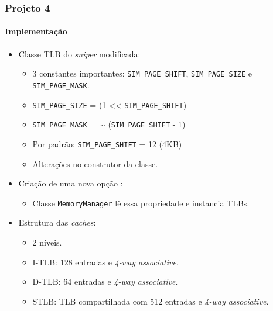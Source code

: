 \documentclass[10pt]{beamer}
\begin{document}
\begin{frame}
\frametitle{Projeto 4}
\framesubtitle{Implementação}

\begin{itemize}

\item Classe TLB do \textit{sniper} modificada:

\begin{itemize} 
	\item 3 constantes importantes: \texttt{SIM\_PAGE\_SHIFT},
	\texttt{SIM\_PAGE\_SIZE} e \texttt{SIM\_PAGE\_MASK}.
	\item \texttt{SIM\_PAGE\_SIZE} = (1 << \texttt{SIM\_PAGE\_SHIFT})
	\item \texttt{SIM\_PAGE\_MASK} = \(\sim\) (\texttt{SIM\_PAGE\_SHIFT} - 1)
	\item Por padrão: \texttt{SIM\_PAGE\_SHIFT} = 12 (4KB)
	\item Alterações no construtor da classe. 
		
\end{itemize} 

\item Criação de uma nova opção :
 
\begin{itemize} 
	\item Classe \texttt{MemoryManager} lê essa propriedade e instancia TLBs.
\end{itemize}

\item Estrutura das \textit{caches}:

\begin{itemize}
  	\item 2 níveis.  
	\item I-TLB: 128 entradas e \textit{4-way associative}.
	\item D-TLB: 64 entradas e \textit{4-way associative}.
	\item STLB: TLB compartilhada com 512 entradas e \textit{4-way associative}.
\end{itemize}
 
\end{itemize}

\end{frame}
\end{document}
